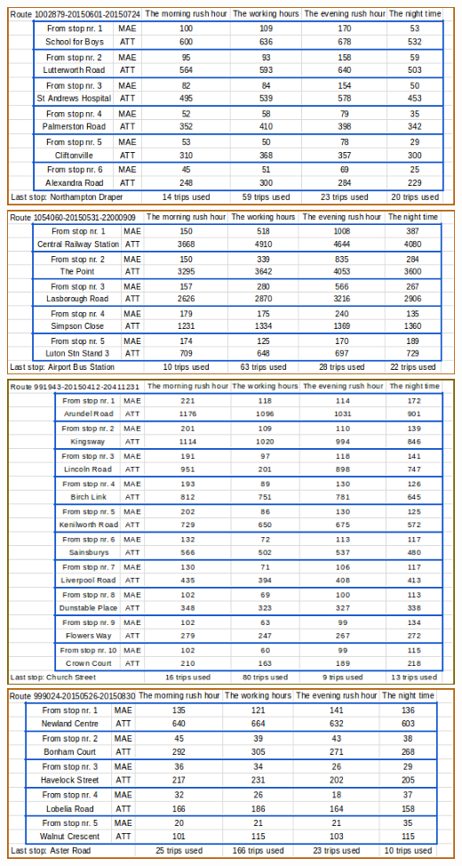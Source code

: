 \documentclass[12pt,a4paper,oneside,openright]{report}
\begin{document}
\includegraphics[width=\textwidth]{figs/table_of_1002879.png}
\includegraphics[width=\textwidth]{figs/table_of_1054060.png}
\includegraphics[width=\textwidth]{figs/table_of_991943.png}
\includegraphics[width=\textwidth]{figs/table_of_999024.png}
\end{document}
